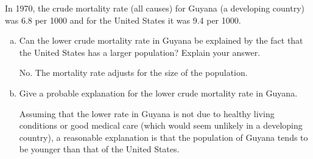 
In 1970, the crude mortality rate (all causes) for Guyana (a
developing country)  was 6.8 per
1000 and for the United States it was 9.4 per 1000.

\begin{enumerate}[(a)]
\item Can the lower crude mortality rate in Guyana be explained by the
  fact that the United States has a larger population?  Explain your
  answer.
\answerSpace{.7in}
\begin{AnswerText}
No.  The mortality rate adjusts for the size of the population.
\end{AnswerText}
\item Give a probable explanation for the lower crude mortality
  rate in Guyana.
\answerSpace{.7in}
\begin{AnswerText}
Assuming that the lower rate in Guyana is not due to healthy living
conditions or good medical care (which would seem unlikely in a
developing country), a reasonable explanation is that the population
of Guyana tends to be younger than that of the United States.
\end{AnswerText}
\end{enumerate}


